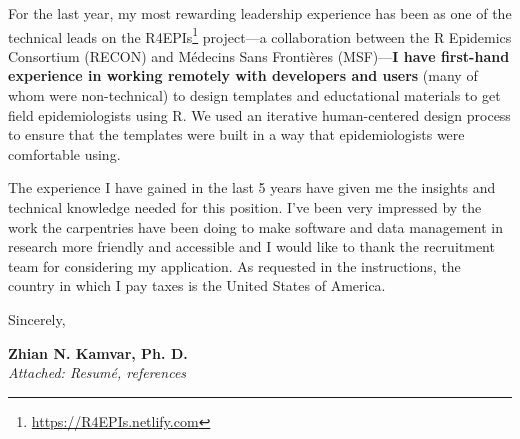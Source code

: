 
\vspace{1ex}

For the last year, my most rewarding leadership experience has been as one of
the technical leads on the R4EPIs\footnote{\url{https://R4EPIs.netlify.com}}
project---a collaboration between the R Epidemics Consortium (RECON) and
M\'{e}decins Sans Fronti\`{e}res (MSF)---\textbf{I have first-hand experience
in working remotely with developers and users} (many of whom were
non-technical) to design templates and eductational materials to get field
epidemiologists using R. We used an iterative human-centered design process to
ensure that the templates were built in a way that epidemiologists were 
comfortable using. 

\vspace{1ex}

The experience I have gained in the last 5 years have given me the insights and
technical knowledge needed for this position. I've been very impressed by the
work the carpentries have been doing to make software and data management in
research more friendly and accessible and I would like to thank the recruitment
team for considering my application. As requested in the instructions, the 
country in which I pay taxes is the United States of America.

\vspace{2ex}

Sincerely,

\vspace{5ex}

\textbf{Zhian N. Kamvar, Ph. D.}\\
\textit{Attached: Resum\'{e}, references}







